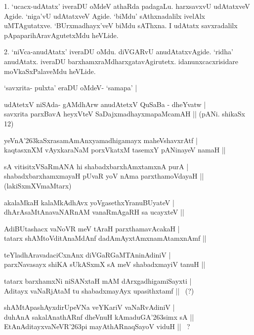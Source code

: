 \begin{artha}
1. `ucacx-udAtatx' iveraDU oMdeV athaRda padagaLu. harxsavxvU udAtatxveV Agide. `niga'vU udAtatxveV Agide. `biMdu' sAthxnadalilx ivelAlx uMTAgutatxve. `BUrxmadhayx'veV biMdu sAThxna. I udAtatx savxradalilx pApaparihAravAgutetxMdu heVLide.
\end{artha}

\begin{artha}
2. `niVca-anudAtatx' iveraDU oMdu. diVGARvU anudAtatxvAgide. `ridha' anudAtatx. iveraDU barxhamxraMdharxgatavAgirutetx. idanunxcacxrisidare moVkaSxPalaveMdu heVLide.
\end{artha}

\begin{itemize}
{\bf 
 \item[3.] `savxrita- pulxta' eraDU oMdeV- `samapa' |
 \item[4.] udAtetxV niSAda- gAMdhArw anudAtetxV QuSaBa - dheYvatw |\\\label{156}
 savxrita parxBavA heyxVteV SaDajxmadhayxmapaMcamAH ||
 \hfill{(pANi. shikaSx 12)}
 \item[5.] yeVnA\char'263kaSxrasamAmAnxyamadhigamayx maheVshavxrAtf |\\\label{157}
 kaqtasxnXM vAyxkaraNaM porxVkatxM tasemxY pANinayeV namaH ||
 \item[6.] sA vitisitxVSaRmANA hi shabadxbarxhAmxtamxnA purA |\\\label{157}
 shabadxbarxhamxmayaH pUvaR yoV nAma parxthamoVdayaH ||\hfill{(lakiSxmXVmaMtarx)}
 \item[7.] akalaMkaH kalaMkAdhAvx yoVgasethxYranuBUyateV |\\\label{157}
 dhArAsaMtAnavaNARnAM vanaRmAgaRH sa ucayxteV ||
 \item[8.] AdiBUtashacx vaNoVR meV tAraH parxthamavAcakaH |\\\label{157}
 tatarx shAMtoVditAnaMdAnf dadAmAyxtAmxnamAtamxnAmf ||
 \item[9.] teYladhAravadaciCxnAnx diVGaRGaMTAninAdiniV |\\
 parxNavasayx shiKA sUkASxmX sA meV shabadxmayiV tanuH ||
 \item[10.] tatarx barxhamxNi niSANxtaH mAM dArxgadhigamiSayxti |\\
 Aditayx vaNaRjAtaM tu shabadxmayAyx upasithxtamf || ~(?)
 \item[11.] shAMtApashAyxdirUpeVNa veYKariV vaNaRvAdiniV |\\
 duhAnA sakalAnathARnf dheVnuH kAmaduGA\char'263simx sA ||\\
 EtAnAditayxvaNeVR\char'263pi mayAthARnaqSayoV viduH || ~?}
\end{itemize}

